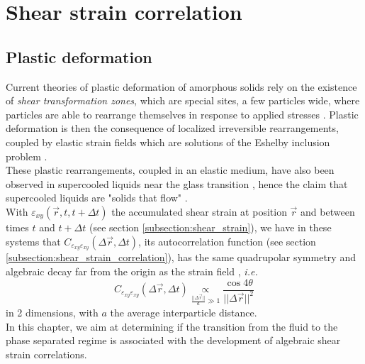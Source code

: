 \documentclass[class=report, float=false, crop=false]{standalone}
\begin{document}
\chapter{Shear strain correlation}
\label{chap:strain}

\section{Plastic deformation}
\label{section:plastic_deformation}

Current theories of plastic deformation of amorphous solids rely on the existence of \textit{shear transformation zones}, which are special sites, a few particles wide, where particles are able to rearrange themselves in response to applied stresses \cite{falk1998dynamics}. Plastic deformation is then the consequence of localized irreversible rearrangements, coupled by elastic strain fields \cite{nicolas2014spatiotemporal} which are solutions of the Eshelby inclusion problem \cite{eshelby1959elastic}.\\

These plastic rearrangements, coupled in an elastic medium, have also been observed in supercooled liquids near the glass transition \cite{chattoraj2013elastic, illing2016strain, hassani2018long}, hence the claim that supercooled liquids are "solids that flow" \cite{dyre2006colloquium}.\\

With $\varepsilon_{xy}(\vec{r}, t, t + \Delta t)$ the accumulated shear strain at position $\vec{r}$ and between times $t$ and $t + \Delta t$ (see section \ref{subsection:shear_strain}), we have in these systems that $C_{\varepsilon_{xy}\varepsilon_{xy}}(\Delta \vec{r}, \Delta t)$, its autocorrelation function (see section \ref{subsection:shear_strain_correlation}), has the same quadrupolar symmetry and algebraic decay far from the origin as the strain field \cite{illing2016strain, hassani2018long}, \textit{i.e.}
\begin{equation}
C_{\varepsilon_{xy}\varepsilon_{xy}}(\Delta \vec{r}, \Delta t) \underset{\frac{||\Delta \vec{r}||}{a} \gg 1}{\propto} \frac{\cos4\theta}{||\Delta \vec{r}||^2}
\label{css_eshelby}
\end{equation}
in 2 dimensions, with $a$ the average interparticle distance.\\

In this chapter, we aim at determining if the transition from the fluid to the phase separated regime is associated with the development of algebraic shear strain correlations.
\end{document}
